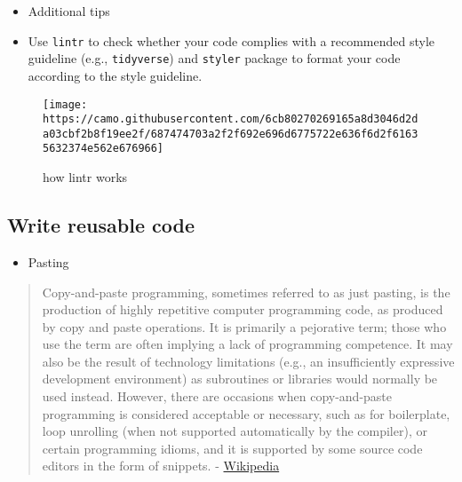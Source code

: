 \documentclass[
]{book}
\providecommand{\tightlist}{%
  \setlength{\itemsep}{0pt}\setlength{\parskip}{0pt}}
\begin{document}
\begin{itemize}
\item
  Additional tips
\item
  Use \texttt{lintr} to check whether your code complies with a recommended style guideline (e.g., \texttt{tidyverse}) and \texttt{styler} package to format your code according to the style guideline.
\end{itemize}

\begin{figure}
\centering
\texttt{[image: https://camo.githubusercontent.com/6cb80270269165a8d3046d2da03cbf2b8f19ee2f/687474703a2f2f692e696d6775722e636f6d2f61635632374e562e676966]}
\caption{how lintr works}
\end{figure}

\hypertarget{write-reusable-code}{%
\subsection{Write reusable code}\label{write-reusable-code}}

\begin{itemize}
\tightlist
\item
  Pasting
\end{itemize}

\begin{quote}
Copy-and-paste programming, sometimes referred to as just pasting, is the production of highly repetitive computer programming code, as produced by copy and paste operations. It is primarily a pejorative term; those who use the term are often implying a lack of programming competence. It may also be the result of technology limitations (e.g., an insufficiently expressive development environment) as subroutines or libraries would normally be used instead. However, there are occasions when copy-and-paste programming is considered acceptable or necessary, such as for boilerplate, loop unrolling (when not supported automatically by the compiler), or certain programming idioms, and it is supported by some source code editors in the form of snippets. - \href{https://en.wikipedia.org/wiki/Copy-and-paste_programming}{Wikipedia}
\end{quote}
\end{document}

